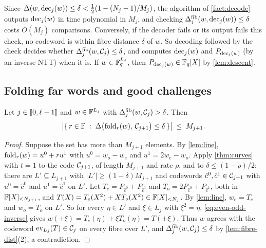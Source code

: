 \begin{remark}\label{rem:decode}
Since $\Delta(w, \mathrm{dec}_j(w)) \le \delta < \tfrac12(1 - (N_j-1)/M_j)$, the algorithm of \cref{fact:decode} outputs $\mathrm{dec}_j(w)$ in time polynomial in $M_j$, and checking $\Delta^{\mathrm{fib}}_j(w, \mathrm{dec}_j(w)) \le \delta$ costs $O(M_j)$ comparisons.
Conversely, if the decoder fails or its output fails this check, no codeword is within fibre distance $\delta$ of $w$. So decoding followed by the check decides whether $\Delta^{\mathrm{fib}}_j(w,\mathcal{C}_j) \le \delta$, and computes $\mathrm{dec}_j(w)$ and $P_{\mathrm{dec}_j(w)}$ (by an inverse NTT) when it is.
If $w \in \mathbb{F}_q^{L_j}$, then $P_{\mathrm{dec}_j(w)} \in \mathbb{F}_q[X]$ by \cref{lem:descent}.
\end{remark}

\subsection{Folding far words and good challenges}\label{sec:fold:good}

\begin{lemma}\label{lem:far}
Let $j \in \llbracket 0, \ell-1 \rrbracket$ and $w \in \mathbb{F}^{L_j}$ with $\Delta^{\mathrm{fib}}_j(w, \mathcal{C}_j) > \delta$. Then
\[
  \bigl|\{\, r \in \mathbb{F} \;:\; \Delta\bigl(\mathrm{fold}_r(w),\, \mathcal{C}_{j+1}\bigr) \le \delta \,\}\bigr| \;\le\; M_{j+1}.
\]
\end{lemma}

\begin{proof}
Suppose the set has more than $M_{j+1}$ elements. By \cref{lem:line}, $\mathrm{fold}_r(w) = u^0 + r u^1$ with $u^0 = w_o - w_e$ and $u^1 = 2w_e - w_o$.
Apply \cref{thm:curves} with $t = 1$ to the code $\mathcal{C}_{j+1}$, of length $M_{j+1}$ and rate $\rho$, and to $\delta \le (1-\rho)/2$: there are $L' \subseteq L_{j+1}$ with $|L'| \ge (1-\delta)M_{j+1}$ and codewords $\hat c^0, \hat c^1 \in \mathcal{C}_{j+1}$ with $u^0 = \hat c^0$ and $u^1 = \hat c^1$ on $L'$.
Let $T_e = P_{\hat c^0} + P_{\hat c^1}$ and $T_o = 2P_{\hat c^0} + P_{\hat c^1}$, both in $\mathbb{F}[X]_{<N_{j+1}}$, and $T(X) = T_e(X^2) + X T_o(X^2) \in \mathbb{F}[X]_{<N_j}$.
By \cref{lem:line}, $w_e = T_e$ and $w_o = T_o$ on $L'$. So for every $\eta \in L'$ and $\xi \in L_j$ with $\xi^2 = \eta$, \eqref{eq:even-odd-inverse} gives $w(\pm \xi) = T_e(\eta) \pm \xi T_o(\eta) = T(\pm \xi)$.
Thus $w$ agrees with the codeword $\mathrm{ev}_{L_j}(T) \in \mathcal{C}_j$ on every fibre over $L'$, and $\Delta^{\mathrm{fib}}_j(w, \mathcal{C}_j) \le \delta$ by \cref{lem:fibre-dist}(2), a contradiction.
\end{proof}

